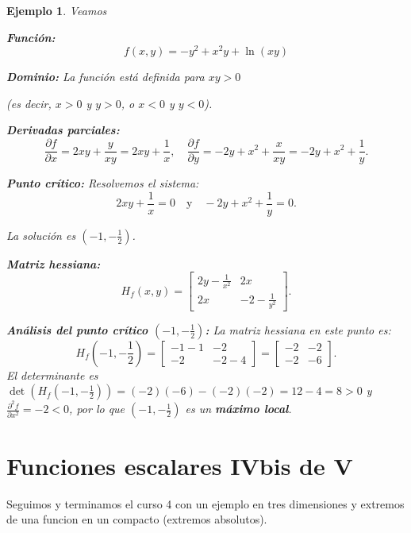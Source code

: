 \documentclass[11pt]{book}
\theoremstyle{definicion}
\theoremstyle{teorema}
\theoremstyle{ejemplo}
\newtheorem{ejemplo}{Ejemplo}[section]
\begin{document}
\begin{ejemplo} Veamos

\textbf{Función: } \[ f(x, y) = -y^2 + x^2y + \ln(xy) \]

\textbf{Dominio: }
La función está definida para \( xy > 0 \) 

(es decir, \( x > 0 \) y \( y > 0 \), o \( x < 0 \) y \( y < 0 \)).

\textbf{Derivadas parciales:}
\[
\frac{\partial f}{\partial x} = 2xy + \frac{y}{xy} = 2xy + \frac{1}{x}, \quad \frac{\partial f}{\partial y} = -2y + x^2 + \frac{x}{xy} = -2y + x^2 + \frac{1}{y}.
\]

\textbf{Punto crítico:}
Resolvemos el sistema:
\[
2xy + \frac{1}{x} = 0 \quad \text{y} \quad -2y + x^2 + \frac{1}{y} = 0.
\]

La solución es \( (-1, -\frac{1}{2}) \).

\textbf{Matriz hessiana:}
\[
H_f(x, y) = \begin{bmatrix}
2y - \frac{1}{x^2} & 2x \\
2x & -2 - \frac{1}{y^2}
\end{bmatrix}.
\]

\textbf{Análisis del punto crítico \( (-1, -\frac{1}{2}) \):}
La matriz hessiana en este punto es:
\[
H_f(-1, -\frac{1}{2}) = \begin{bmatrix}
-1 - 1 & -2 \\
-2 & -2 - 4
\end{bmatrix}
= \begin{bmatrix}
-2 & -2 \\
-2 & -6
\end{bmatrix}.
\]
El determinante es \( \det(H_f(-1, -\frac{1}{2})) = (-2)(-6) - (-2)(-2) = 12 - 4 = 8 > 0 \) y \( \frac{\partial^2 f}{\partial x^2} = -2 < 0 \), por lo que \( (-1, -\frac{1}{2}) \) es un \textbf{máximo local}.
\end{ejemplo}




\chapter{Funciones escalares IVbis de V}

\noindent
Seguimos y terminamos el curso 4 con 
un ejemplo en tres dimensiones y extremos de una funcion en un compacto (extremos absolutos).
\end{document}
